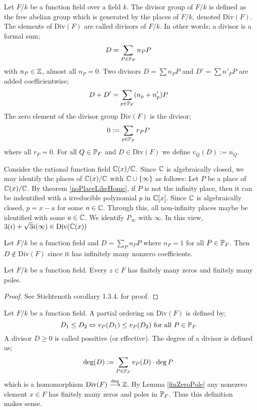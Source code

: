 \begin{definition} \label{Divisor}
	Let $F/k $ be a function field over a 
	field $k$. The divisor group of $F/k$ is defined 
	as the free abelian group which is generated by 
	the places of $F/k$, denoted $\text{Div}(F)$. The 
	elements of $\text{Div}(F)$ are called divisors of $F/k$. 
	In other words; a divisor is a formal sum;
	$$ D = \sum_{P \in \mathbb{P}_F } n_P P $$ with $n_P \in \mathbb{Z}$, 
	almost all $n_P = 0$. Two divisors $D = \sum n_P P$ and
	$D' = \sum n'_P P $ are added coefficientwise;
	$$ D + D' = \sum_{p \in \mathbb{P}_F } (n_p + n'_p) P$$ The 
	zero element of the divisor group $\text{Div}(F)$ is the divisor;
	$$ 0 := \sum_{p \in \mathbb{P}_F} r_P P$$ where all $r_P =  0$. 
	For all $Q \in \mathbb{P}_F $ and $D \in \text{Div} (F)$ we define
	$v_Q(D) := n_Q$.
\end{definition}

\begin{example}
	Consider the rational function field $\mathbb{C}(x)/\mathbb{C}$. Since 
	$\mathbb{C} $ is algebraically closed, we may identify the places
	of $\mathbb{C}(x)/\mathbb{C}$ with $\mathbb{C} \cup \lbrace \infty \rbrace $
	as follows: Let $P$ be a place of $\mathbb{C}(x)/\mathbb{C}$.
	By theorem \ref{noPlaceLikeHome}, if $P$ is not the infinity 
	place, then it can be indentified with 
	a irreducible polynomial $p$ in $\mathbb{C}[x]$. 
	Since $\mathbb{C}$ is algebraically closed,
	$p = x - a$ for some $a \in \mathbb{C}$. Through this, 
	all non-infinity places maybe be identified with some 
	$a \in \mathbb{C}$. We identify $P_\infty$ with $\infty$.
	In this view, $3(i) + \sqrt{3}i(\infty) \in \text{Div}(\mathbb{C}(x))$
\end{example}

\begin{example}
	Let $F/k$ be a function field and $D = \sum_Pn_PP $ where 
	$n_P = 1 $ for all $P\in \mathbb{P}_F$. Then $D  \notin \text{Div}(F)$
	since it has infinitely many nonzero coefficients.  
\end{example}

\begin{lemma} \label{finZeroPole}
	Let $F/k$ be a function field. Every $z \in F$ has finitely
	many zeros and finitely many poles.
\end{lemma}

\begin{proof}
	See Stichtenoth corollary 1.3.4. for proof. 
\end{proof}

\begin{definition} \label{divValuation}
	Let $F/k $ be a function field. 
	A partial ordering on $\text{Div}(F)$ is defined by;
	$$ D_1 \leq D_2 \Leftrightarrow v_P(D_1) \leq v_P(D_2) \text{ for all } P\in \mathbb{P}_F $$ 
	A divisor $D \geq 0 $ is called possitive (or effective). 
	The degree of a divisor is defined as;
	$$ \text{deg}(D) := \sum _{P \in \mathbb{P}_F}v_P (D) \cdot \deg P  $$ 
	which is a homomorphism $\text{Div}(F) \stackrel{\text{deg}}{\longrightarrow} \mathbb{Z} $. 
	By Lemma \ref{finZeroPole} any nonezero element $x \in F$ 
	has finitely many zeros and poles in $\mathbb{P}_F$. Thus this 
	definition makes sense.
\end{definition}

